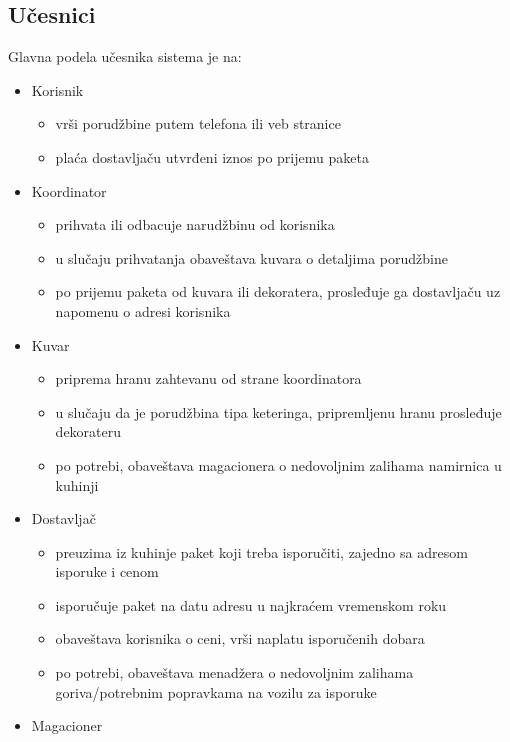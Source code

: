 \subsection{Učesnici}
Glavna podela učesnika sistema je na:

\begin{itemize}
    \item Korisnik
    \begin{itemize}
        \item vrši porudžbine putem telefona ili veb stranice
        \item plaća dostavljaču utvrđeni iznos po prijemu paketa
    \end{itemize}
    \item Koordinator
    \begin{itemize}
        \item prihvata ili odbacuje narudžbinu od korisnika
        \item u slučaju prihvatanja obaveštava kuvara o detaljima porudžbine
        \item po prijemu paketa od kuvara ili dekoratera, prosleđuje ga dostavljaču uz napomenu o adresi korisnika
    \end{itemize}
    \item Kuvar
    \begin{itemize}
        \item priprema hranu zahtevanu od strane koordinatora
        \item u slučaju da je porudžbina tipa keteringa, pripremljenu hranu prosleđuje dekorateru
        \item po potrebi, obaveštava magacionera o nedovoljnim zalihama namirnica u kuhinji
    \end{itemize}
    \item Dostavljač
    \begin{itemize}
        \item preuzima iz kuhinje paket koji treba isporučiti, zajedno sa adresom isporuke i cenom
        \item isporučuje paket na datu adresu u najkraćem vremenskom roku
        \item obaveštava korisnika o ceni, vrši naplatu isporučenih dobara
        \item po potrebi, obaveštava menadžera o nedovoljnim zalihama goriva/potrebnim popravkama na vozilu za isporuke
    \end{itemize}
    \item Magacioner
    \begin{itemize}

\end{itemize}
\end{itemize}
